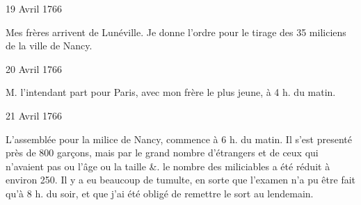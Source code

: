                      \begin{diary}{19 Avril 1766}{}


                           Mes
                              frères arrivent de Lunéville. Je donne
                           l'ordre pour le tirage des 35 miliciens de
                           la ville de Nancy. \bigskip


                     \end{diary}

                     \begin{diary}{20 Avril 1766}{}


                           M. l'intendant part pour
                              Paris, avec
                           mon frère le plus
                              jeune, à 4 h. du matin. \bigskip


                     \end{diary}

                     \begin{diary}{21 Avril 1766}{}

                         L'assemblée pour la milice de Nancy, commence
                           à 6 h. du matin. Il s'est presenté près de
                           800 garçons, mais par le grand nombre
                           d'étrangers et de ceux qui n'avaient pas ou
                           l'âge ou la taille \&. le nombre des miliciables
                           a été réduit à environ 250. Il y a eu
                           beaucoup de tumulte, en sorte que l'examen
                           n'a pu être fait qu'à 8 h. du soir, et que
                           j'ai été obligé de remettre le sort au lendemain. \bigskip


                     \end{diary}

